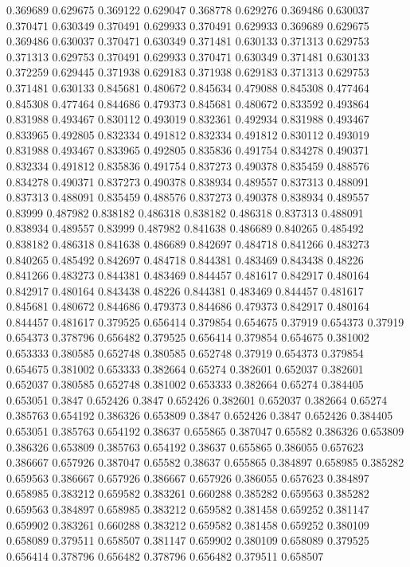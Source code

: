 0.369689 0.629675
0.369122 0.629047
0.368778 0.629276
0.369486 0.630037
0.370471 0.630349
0.370491 0.629933
0.370491 0.629933
0.369689 0.629675
0.369486 0.630037
0.370471 0.630349
0.371481 0.630133
0.371313 0.629753
0.371313 0.629753
0.370491 0.629933
0.370471 0.630349
0.371481 0.630133
0.372259 0.629445
0.371938 0.629183
0.371938 0.629183
0.371313 0.629753
0.371481 0.630133
0.845681 0.480672
0.845634 0.479088
0.845308 0.477464
0.845308 0.477464
0.844686 0.479373
0.845681 0.480672
0.833592 0.493864
0.831988 0.493467
0.830112 0.493019
0.832361 0.492934
0.831988 0.493467
0.833965 0.492805
0.832334 0.491812
0.832334 0.491812
0.830112 0.493019
0.831988 0.493467
0.833965 0.492805
0.835836 0.491754
0.834278 0.490371
0.832334 0.491812
0.835836 0.491754
0.837273 0.490378
0.835459 0.488576
0.834278 0.490371
0.837273 0.490378
0.838934 0.489557
0.837313 0.488091
0.837313 0.488091
0.835459 0.488576
0.837273 0.490378
0.838934 0.489557
0.83999 0.487982
0.838182 0.486318
0.838182 0.486318
0.837313 0.488091
0.838934 0.489557
0.83999 0.487982
0.841638 0.486689
0.840265 0.485492
0.838182 0.486318
0.841638 0.486689
0.842697 0.484718
0.841266 0.483273
0.840265 0.485492
0.842697 0.484718
0.844381 0.483469
0.843438 0.48226
0.841266 0.483273
0.844381 0.483469
0.844457 0.481617
0.842917 0.480164
0.842917 0.480164
0.843438 0.48226
0.844381 0.483469
0.844457 0.481617
0.845681 0.480672
0.844686 0.479373
0.844686 0.479373
0.842917 0.480164
0.844457 0.481617
0.379525 0.656414
0.379854 0.654675
0.37919 0.654373
0.37919 0.654373
0.378796 0.656482
0.379525 0.656414
0.379854 0.654675
0.381002 0.653333
0.380585 0.652748
0.380585 0.652748
0.37919 0.654373
0.379854 0.654675
0.381002 0.653333
0.382664 0.65274
0.382601 0.652037
0.382601 0.652037
0.380585 0.652748
0.381002 0.653333
0.382664 0.65274
0.384405 0.653051
0.3847 0.652426
0.3847 0.652426
0.382601 0.652037
0.382664 0.65274
0.385763 0.654192
0.386326 0.653809
0.3847 0.652426
0.3847 0.652426
0.384405 0.653051
0.385763 0.654192
0.38637 0.655865
0.387047 0.65582
0.386326 0.653809
0.386326 0.653809
0.385763 0.654192
0.38637 0.655865
0.386055 0.657623
0.386667 0.657926
0.387047 0.65582
0.38637 0.655865
0.384897 0.658985
0.385282 0.659563
0.386667 0.657926
0.386667 0.657926
0.386055 0.657623
0.384897 0.658985
0.383212 0.659582
0.383261 0.660288
0.385282 0.659563
0.385282 0.659563
0.384897 0.658985
0.383212 0.659582
0.381458 0.659252
0.381147 0.659902
0.383261 0.660288
0.383212 0.659582
0.381458 0.659252
0.380109 0.658089
0.379511 0.658507
0.381147 0.659902
0.380109 0.658089
0.379525 0.656414
0.378796 0.656482
0.378796 0.656482
0.379511 0.658507
